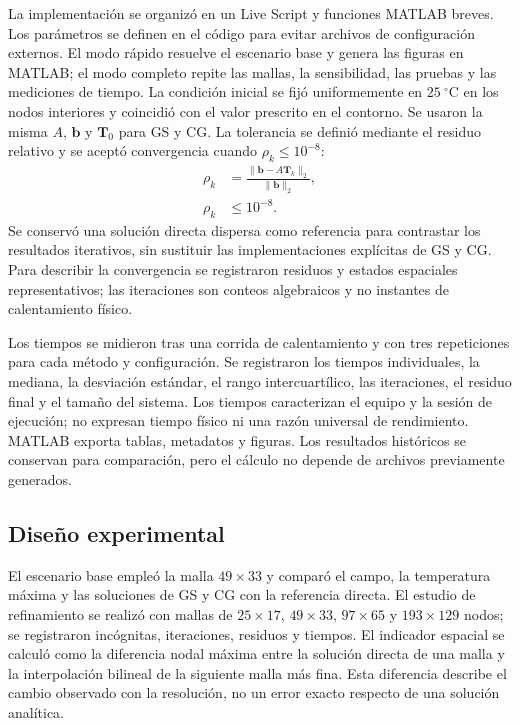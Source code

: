 La implementaci\'on se organiz\'o en un Live Script y funciones MATLAB breves. Los par\'ametros se definen en el c\'odigo para evitar archivos de configuraci\'on externos. El modo r\'apido resuelve el escenario base y genera las figuras en MATLAB; el modo completo repite las mallas, la sensibilidad, las pruebas y las mediciones de tiempo. La condici\'on inicial se fij\'o uniformemente en $25\ ^\circ$C en los nodos interiores y coincidi\'o con el valor prescrito en el contorno. Se usaron la misma $A$, $\mathbf{b}$ y $\mathbf{T}_0$ para GS y CG. La tolerancia se defini\'o mediante el residuo relativo y se acept\'o convergencia cuando $\rho_k\leq10^{-8}$:
\begin{align}
\rho_k&=\frac{\|\mathbf{b}-A\mathbf{T}_k\|_2}{\|\mathbf{b}\|_2},
\label{eq:residuo-relativo}\\
\rho_k&\leq10^{-8}.
\end{align}
Se conserv\'o una soluci\'on directa dispersa como referencia para contrastar los resultados iterativos, sin sustituir las implementaciones expl\'icitas de GS y CG. Para describir la convergencia se registraron residuos y estados espaciales representativos; las iteraciones son conteos algebraicos y no instantes de calentamiento f\'isico.

Los tiempos se midieron tras una corrida de calentamiento y con tres repeticiones para cada m\'etodo y configuraci\'on. Se registraron los tiempos individuales, la mediana, la desviaci\'on est\'andar, el rango intercuart\'ilico, las iteraciones, el residuo final y el tama\~no del sistema. Los tiempos caracterizan el equipo y la sesi\'on de ejecuci\'on; no expresan tiempo f\'isico ni una raz\'on universal de rendimiento. MATLAB exporta tablas, metadatos y figuras. Los resultados hist\'oricos se conservan para comparaci\'on, pero el c\'alculo no depende de archivos previamente generados.

\subsection{Dise\~no experimental}

El escenario base emple\'o la malla $49\times33$ y compar\'o el campo, la temperatura m\'axima y las soluciones de GS y CG con la referencia directa. El estudio de refinamiento se realiz\'o con mallas de $25\times17$, $49\times33$, $97\times65$ y $193\times129$ nodos; se registraron inc\'ognitas, iteraciones, residuos y tiempos. El indicador espacial se calcul\'o como la diferencia nodal m\'axima entre la soluci\'on directa de una malla y la interpolaci\'on bilineal de la siguiente malla m\'as fina. Esta diferencia describe el cambio observado con la resoluci\'on, no un error exacto respecto de una soluci\'on anal\'itica.

